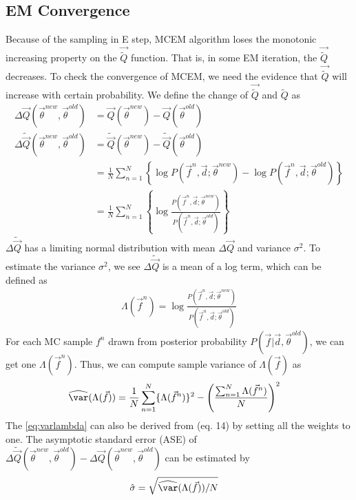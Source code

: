 \documentclass{article}
\begin{document}
\subsection{EM Convergence}
Because of the sampling in E step, MCEM algorithm loses the monotonic
increasing property on the $\vec {\tilde Q}$ function. That is, in
some EM iteration, the $\vec {\tilde Q}$ decreases. To check the
convergence of MCEM, we need the evidence that $\vec {\tilde Q}$ will
increase with certain probability. We define the change of $\vec {\tilde Q}$ and $ {\tilde Q}$ as 
\begin{align*}
 \Delta {\vec Q}(\vec \theta^{new}, \vec \theta^{old}) &= {\vec Q}(\vec \theta^{new}) - {\vec Q}(\vec \theta^{old})\\
 \Delta \widetilde {\vec Q}(\vec \theta^{new}, \vec \theta^{old}) &= \widetilde {\vec Q}(\vec \theta^{new}) - \widetilde {\vec Q}(\vec \theta^{old}) \\
 &= \frac{1}{N}\sum_{n=1}^{N}\left \{ \log P(\vec f^n, \vec d; \vec \theta^{new}) - \log P(\vec f^n, \vec d; \vec \theta^{old})\right \}\\
 &= \frac{1}{N}\sum_{n=1}^{N}\left \{ \log \frac{P(\vec f^n, \vec d; \vec \theta^{new})}{ P(\vec f^n, \vec d; \vec \theta^{old})}\right \}
\end{align*}
$ \Delta \widetilde {\vec Q}$ has a limiting normal distribution with
mean $\Delta {\vec Q}$ and variance $\sigma^2$. To estimate the
variance $\sigma^2$, we see $ \Delta \widetilde {\vec Q}$ is a mean of
a log term, which can be defined as
\begin{align*}
  \Lambda (\vec f^n) = \log \frac{P(\vec f^n, \vec d; \vec \theta^{new})}{ P(\vec f^n, \vec d; \vec \theta^{old})} 
\end{align*}
For each MC sample $f^n$ drawn from posterior probability $P(\vec f| \vec d, \vec \theta^{old})$, we can get one $\Lambda(\vec f^n)$. Thus, we can compute sample variance of $\Lambda(\vec f)$ as
\begin{align}
\widehat  \var(\Lambda(\vec f)) &= \frac{1}{N}\sum_{n = 1}^{N}\{\Lambda(\vec f^n)\}^2 - \left (\frac{\sum_{n=1}^{N} \Lambda(\vec f^n)}{N} \right )^2 
\label{eq:varlambda}
\end{align}
The \eqref{eq:varlambda} can also be derived from \citet{caffo2005ascent} (eq. 14) by setting all the weights to one. The asymptotic standard error (ASE) of $ \Delta \widetilde {\vec Q}(\vec \theta^{new}, \vec \theta^{old}) -  \Delta {\vec Q}(\vec \theta^{new}, \vec \theta^{old})$ can be estimated by 
\begin{align*}
  \hat \sigma &= \sqrt{\widehat  \var(\Lambda(\vec f))/N}
\end{align*}
\end{document}
